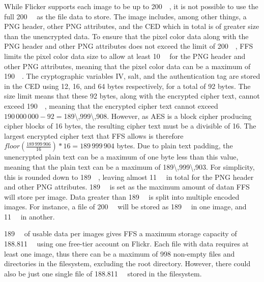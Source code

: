 While Flicker supports each image to be up to \SI{200}{\mega\byte}, it is not possible to use the full \SI{200}{\mega\byte} as the file data to store. The image includes, among other things, a PNG header, other PNG attributes, and the CED which in total is of greater size than the unencrypted data. To ensure that the pixel color data along with the PNG header and other PNG attributes does not exceed the limit of \SI{200}{\mega\byte}, FFS limits the pixel color data size to allow at least \SI{10}{\mega\byte} for the PNG header and other PNG attributes, meaning that the pixel color data can be a maximum of \SI{190}{\mega\byte}. The cryptographic variables IV, salt, and the authentication tag are stored in the CED using 12, 16, and 64 bytes respectively, for a total of 92 bytes. The size limit means that these 92 bytes, along with the encrypted cipher text, cannot exceed \SI{190}{\mega\byte}, meaning that the encrypted cipher text cannot exceed $190\,000\,000 - 92 = $\SI{189\,999\,908}{\byte}. However, as AES is a block cipher producing cipher blocks of 16 bytes, the resulting cipher text must be a divisible of 16. The largest encrypted cipher text that FFS allows is therefore $floor(\frac{189\,999\,906}{16})*16 = 189\,999\,904$ bytes. Due to plain text padding, the unencrypted plain text can be a maximum of one byte less than this value, meaning that the plain text can be a maximum of \SI{189\,999\,903}{\byte}. For simplicity, this is rounded down to \SI{189}{\mega\byte}, leaving almost \SI{11}{\mega\byte} in total for the PNG header and other PNG attributes. \SI{189}{\mega\byte} is set as the maximum amount of datan FFS will store per image. Data greater than \SI{189}{\mega\byte} is split into multiple encoded images. For instance, a file of \SI{200}{\mega\byte} will be stored as \SI{189}{\mega\byte} in one image, and \SI{11}{\mega\byte} in another. 

\SI{189}{\mega\byte} of usable data per images gives FFS a maximum storage capacity of \SI{188.811}{\giga\byte} using one free-tier account on Flickr. Each file with data requires at least one image, thus there can be a maximum of 998 non-empty files and directories in the filesystem, excluding the root directory. However, there could also be just one single file of \SI{188.811}{\giga\byte} stored in the filesystem.

